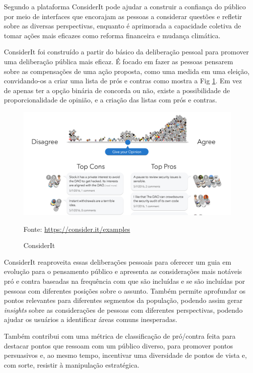 Segundo \cite{bennett2012} a plataforma ConsiderIt pode ajudar a construir a confiança do público por meio de interfaces que encorajam as pessoas a considerar questões e refletir sobre as diversas perspectivas, enquanto é aprimorada a capacidade coletiva de tomar ações mais eficazes como reforma financeira e mudança climática.

ConsiderIt foi construído a partir do básico da deliberação pessoal para promover uma deliberação pública mais eficaz. É focado em fazer as pessoas pensarem sobre as compensações de uma ação proposta, como uma medida em uma eleição, convidando-os a criar uma lista de prós e contras como mostra a Fig \ref{fig04}. Em vez de apenas ter a opção binária de concorda ou não, existe a possibilidade de proporcionalidade de opinião, e a criação das listas com prós e contras. 

\begin{figure}[h]
	\centering
	\includegraphics[keepaspectratio=true,scale=0.4]{figuras/considerit.png}
	\caption{ConsiderIt}
	Fonte: \url{https://consider.it/examples}
	\label{fig04}
\end{figure}


ConsiderIt reaproveita essas deliberações pessoais para oferecer um guia em evolução para o pensamento público e apresenta as considerações mais notáveis pró e contra baseadas na frequência com que são incluídas e se são incluídas por pessoas com diferentes posições sobre o assunto. Também permite aprofundar os pontos relevantes para diferentes segmentos da população, podendo assim gerar \textit{insights} sobre as considerações de pessoas com diferentes perspectivas, podendo ajudar os usuários a identificar áreas comuns inesperadas. 

Também contribui com uma métrica de classificação de pró/contra feita para destacar pontos que ressoam com um público diverso, para promover pontos persuasivos e, ao mesmo tempo, incentivar uma diversidade de pontos de vista e, com sorte, resistir à manipulação estratégica.


